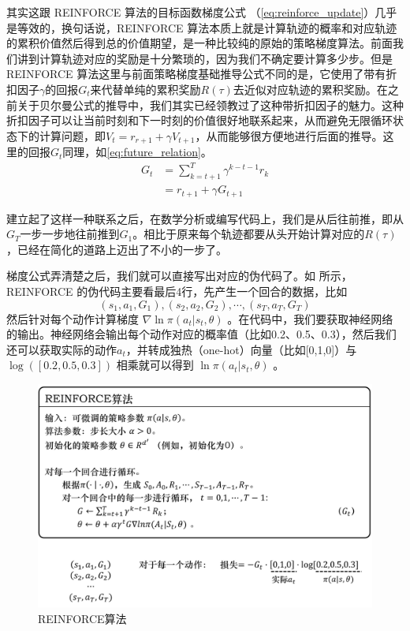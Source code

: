 其实这跟 REINFORCE 算法的目标函数梯度公式 （\eqref{eq:reinforce_update}）几乎是等效的，换句话说，REINFORCE 算法本质上就是计算轨迹的概率和对应轨迹的累积价值然后得到总的价值期望，是一种比较纯的原始的策略梯度算法。前面我们讲到计算轨迹对应的奖励是十分繁琐的，因为我们不确定要计算多少步。但是 REINFORCE 算法这里与前面策略梯度基础推导公式不同的是，它使用了带有折扣因子$\gamma$的回报$G_t$来代替单纯的累积奖励$R(\tau)$去近似对应轨迹的累积奖励。在之前关于贝尔曼公式的推导中，我们其实已经领教过了这种带折扣因子的魅力。这种折扣因子可以让当前时刻和下一时刻的价值很好地联系起来，从而避免无限循环状态下的计算问题，即$V_t = r_{r+1}+\gamma V_{t+1}$，从而能够很方便地进行后面的推导。这里的回报$G_t$同理，如\eqref{eq:future_relation}。
\begin{equation}
    \label{eq:future_relation}
    \begin{aligned}
        G_{t} &=\sum_{k=t+1}^{T} \gamma^{k-t-1} r_{k} \\
        &=r_{t+1}+\gamma G_{t+1}
        \end{aligned}
\end{equation}

建立起了这样一种联系之后，在数学分析或编写代码上，我们是从后往前推，即从$G_T$一步一步地往前推到$G_1$。相比于原来每个轨迹都要从头开始计算对应的$R(\tau)$，已经在简化的道路上迈出了不小的一步了。

梯度公式弄清楚之后，我们就可以直接写出对应的伪代码了。如 所示，
REINFORCE 的伪代码主要看最后4行，先产生一个回合的数据，比如 
$$
(s_1,a_1,G_1),(s_2,a_2,G_2),\cdots,(s_T,a_T,G_T)
$$
然后针对每个动作计算梯度 $\nabla \ln \pi(a_t|s_t,\theta)$ 。在代码中，我们要获取神经网络的输出。神经网络会输出每个动作对应的概率值（比如0.2、0.5、0.3），然后我们还可以获取实际的动作$a_t$，并转成独热（one-hot）向量（比如[0,1,0]）与 $\log ([0.2,0.5,0.3])$ 相乘就可以得到 $\ln \pi(a_t|s_t,\theta)$  。
\begin{figure}[hbt]
    \centering
    \includegraphics[width=0.5\linewidth]{ch6/figs/REINFORCE.png}
    \caption{REINFORCE算法}
    \label{fig:REINFORCE}
\end{figure}

